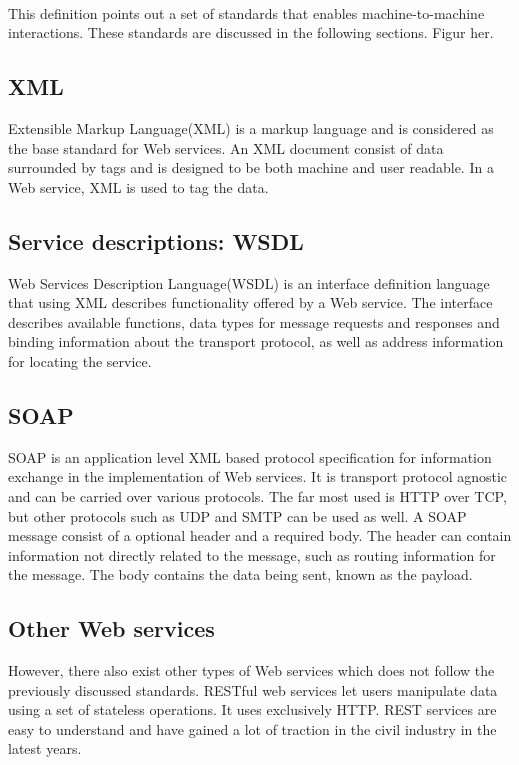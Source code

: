 \documentclass[USenglish]{ifimaster}
\begin{document}
\paragraph{}
This definition points out a set of standards that enables machine-to-machine
interactions. These standards are discussed in the following sections.
Figur her.

\subsection{XML}
Extensible Markup Language(XML) is a markup language and is considered as the
base standard for Web services. An XML document consist of data surrounded by
tags and is designed to be both machine and user readable. In a Web service, XML
is used to tag the data.
\subsection{Service descriptions: WSDL}
Web Services Description Language(WSDL) is an interface definition language that
using XML describes functionality offered by a Web service. The interface
describes available functions, data types for message requests and responses and
binding information about the transport protocol, as well as address information
for locating the service.
\subsection{SOAP}
SOAP is an application level XML based protocol specification for information
exchange in the implementation of Web services. It is transport protocol
agnostic and can be carried over various protocols. The far most used is HTTP
over TCP, but other protocols such as UDP and SMTP can be used as well.
A SOAP message consist of a optional header and a required body. The header can
contain information not directly related to the message, such as routing
information for the message. The body contains the data being sent, known as the
payload.
\subsection{Other Web services}
However, there also exist other types of Web services which does not follow the
previously discussed standards. RESTful web services let users manipulate data
using a set of stateless operations. It uses exclusively HTTP. REST services are
easy to understand and have gained a lot of traction in the civil industry in
the latest years.
\end{document}
